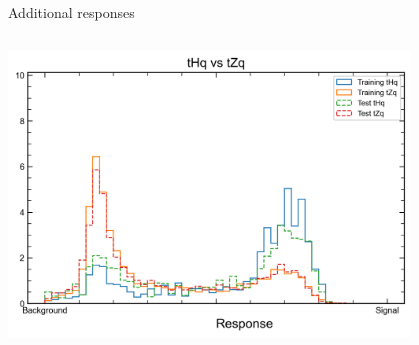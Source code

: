 \begin{frame}{Additional responses}
\begin{columns}
\begin{column}{0.5\textwidth}
      \includegraphics[width=0.8\textwidth]{resp4}
    \end{column}
  \end{columns}    
\end{frame}

